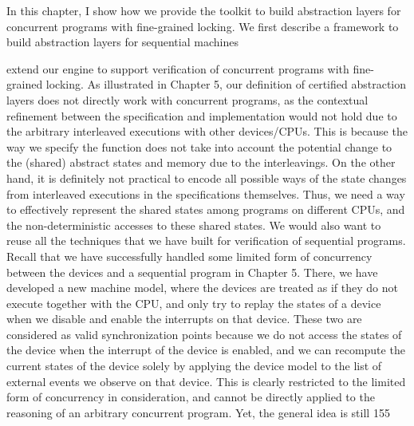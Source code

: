 
In this chapter, I show how we provide the toolkit to build abstraction layers for concurrent programs with fine-grained locking. 
We first describe a framework to build 
abstraction layers for sequential machines 



extend our engine to support verification of concurrent programs with fine-grained locking. As illustrated in Chapter 5, our definition of certified abstraction layers does not directly work with concurrent programs, as the contextual refinement between the specification and implementation would not hold due to the arbitrary interleaved executions with other devices/CPUs. This is because the way we specify the function does not take into account the potential change to the (shared) abstract states and memory due to the interleavings. On the other hand, it is definitely not practical to encode all possible ways of the state changes from interleaved executions in the specifications themselves.
Thus, we need a way to effectively represent the shared states among programs on different CPUs, and the non-deterministic accesses to these shared states. We would also want to reuse all the techniques that we have built for verification of sequential programs. Recall that we have successfully handled some limited form of concurrency between the devices and a sequential program in Chapter 5. There, we have developed a new machine model, where the devices are treated as if they do not execute together with the CPU, and only try to replay the states of a device when we disable and enable the interrupts on that device. These two are considered as valid synchronization points because we do not access the states of the device when the interrupt of the device is enabled, and we can recompute the current states of the device solely by applying the device model to the list of external events we observe on that device.
This is clearly restricted to the limited form of concurrency in consideration, and cannot be directly applied to the reasoning of an arbitrary concurrent program. Yet, the general idea is still
155
